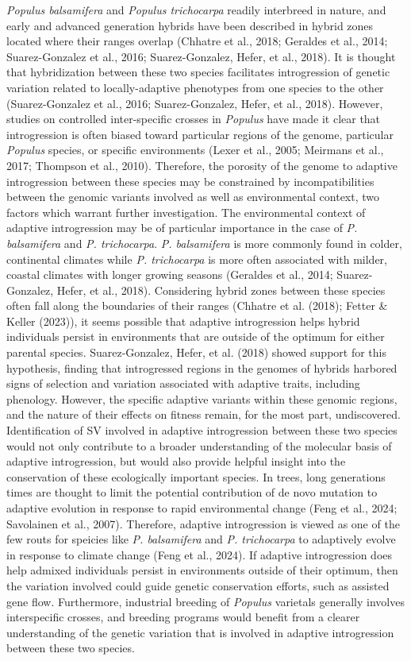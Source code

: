 \documentclass[
]{agujournal2019}
\begin{document}
\emph{Populus balsamifera} and \emph{Populus trichocarpa} readily
interbreed in nature, and early and advanced generation hybrids have
been described in hybrid zones located where their ranges overlap
(Chhatre et al., 2018; Geraldes et al., 2014; Suarez-Gonzalez et al.,
2016; Suarez-Gonzalez, Hefer, et al., 2018). It is thought that
hybridization between these two species facilitates introgression of
genetic variation related to locally-adaptive phenotypes from one
species to the other (Suarez-Gonzalez et al., 2016; Suarez-Gonzalez,
Hefer, et al., 2018). However, studies on controlled inter-specific
crosses in \emph{Populus} have made it clear that introgression is often
biased toward particular regions of the genome, particular
\emph{Populus} species, or specific environments (Lexer et al., 2005;
Meirmans et al., 2017; Thompson et al., 2010). Therefore, the porosity
of the genome to adaptive introgression between these species may be
constrained by incompatibilities between the genomic variants involved
as well as environmental context, two factors which warrant further
investigation. The environmental context of adaptive introgression may
be of particular importance in the case of \emph{P. balsamifera} and
\emph{P. trichocarpa}. \emph{P. balsamifera} is more commonly found in
colder, continental climates while \emph{P. trichocarpa} is more often
associated with milder, coastal climates with longer growing seasons
(Geraldes et al., 2014; Suarez-Gonzalez, Hefer, et al., 2018).
Considering hybrid zones between these species often fall along the
boundaries of their ranges (Chhatre et al. (2018); Fetter \& Keller
(2023)), it seems possible that adaptive introgression helps hybrid
individuals persist in environments that are outside of the optimum for
either parental species. Suarez-Gonzalez, Hefer, et al. (2018) showed
support for this hypothesis, finding that introgressed regions in the
genomes of hybrids harbored signs of selection and variation associated
with adaptive traits, including phenology. However, the specific
adaptive variants within these genomic regions, and the nature of their
effects on fitness remain, for the most part, undiscovered.
Identification of SV involved in adaptive introgression between these
two species would not only contribute to a broader understanding of the
molecular basis of adaptive introgression, but would also provide
helpful insight into the conservation of these ecologically important
species. In trees, long generations times are thought to limit the
potential contribution of de novo mutation to adaptive evolution in
response to rapid environmental change (Feng et al., 2024; Savolainen et
al., 2007). Therefore, adaptive introgression is viewed as one of the
few routs for speicies like \emph{P. balsamifera} and \emph{P.
trichocarpa} to adaptively evolve in response to climate change (Feng et
al., 2024). If adaptive introgression does help admixed individuals
persist in environments outside of their optimum, then the variation
involved could guide genetic conservation efforts, such as assisted gene
flow. Furthermore, industrial breeding of \emph{Populus} varietals
generally involves interspecific crosses, and breeding programs would
benefit from a clearer understanding of the genetic variation that is
involved in adaptive introgression between these two species.
\end{document}
